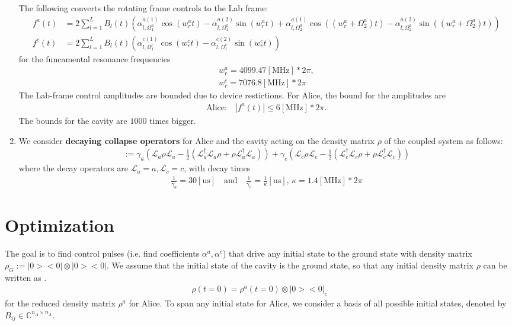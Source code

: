 \documentclass[letterpaper]{article}
\newcommand{\Ell}{\mathcal{L}}
\newcommand{\C}{\mathds{C}}
\begin{document}
\begin{enumerate}
   The following converts the rotating frame controls to the Lab frame:
   \begin{align}
       f^a(t) &= 2\sum_{l=1}^L B_l(t) \left(\alpha^{a(1)}_{l,\Omega^a_1}\cos(w_r^a t) - \alpha^{a(2)}_{l,\Omega^a_1}\sin(w_r^a t) + \alpha^{a(1)}_{l,\Omega^a_2}\cos( \left(w_r^a + \Omega^a_2\right) t) - \alpha^{a(2)}_{l,\Omega^a_2}\sin(\left(w_r^a + \Omega^a_2\right) t)  \right) \\
       f^c(t) &= 2\sum_{l=1}^L B_l(t) \left(\alpha^{c(1)}_{l,\Omega^c_1}\cos(w_r^c t) - \alpha^{c(2)}_{l,\Omega^c_1}\sin(w_r^c t) \right)
   \end{align}
   for the funcamental resonance frequencies
   \begin{align}
       w_r^a = 4099.47 [\text{MHz}] * 2\pi, \\
       w_r^c = 7076.8 [\text{MHz}] * 2\pi
   \end{align}
   The Lab-frame control amplitudes are bounded due to device restictions. For Alice, the bound for the amplitudes are
   \begin{align}
       \text{Alice:} \quad |f^a(t)| \leq 6 [\text{MHz}] * 2\pi.
   \end{align}
   The bounds for the cavity are $1000$ times bigger. 

  \item We consider \textbf{decaying collapse operators} for Alice and the cavity acting on the density matrix $\rho$ of the coupled system as follows:
   \begin{align}
       [\Ell \rho] := \gamma_a \left(\Ell_a\rho\Ell_a - \frac{1}{2} \left( \Ell_a^\dagger \Ell_a \rho + \rho \Ell_a^\dagger \Ell_a \right) \right)
       + \gamma_c \left(\Ell_c\rho\Ell_c - \frac{1}{2} \left( \Ell_c^\dagger \Ell_c \rho + \rho \Ell_c^\dagger \Ell_c \right) \right)
   \end{align}
   where the decay operators are $\Ell_a = a, \Ell_c = c$, with decay times 
   \begin{align}
       \frac{1}{\gamma_a} = 30 [\text{us}] \quad \text{and} \quad \frac{1}{\gamma_c} = \frac{1}{\kappa} [\text{us}], \, \kappa = 1.4 [\text{MHz}] * 2\pi
   \end{align}
\end{enumerate}

\section{Optimization}
The goal is to find control pulses (i.e. find coefficients $\alpha^a, \alpha^c$) that drive any initial state to the ground state with density matrix $\rho_G := |0><0| \otimes |0><0|$. We assume that the initial state of the cavity is the ground state, so that any initial density matrix $\rho$ can be written as . 
\begin{align}
    \rho(t=0) = \rho^a(t=0) \otimes |0><0|_c
\end{align}
for the reduced density matrix $\rho^a$ for Alice. To span any initial state for Alice, we consider a basis of all possible initial states, denoted by $B_{ij} \in \C^{n_A\times n_A}$. 
\end{document}
